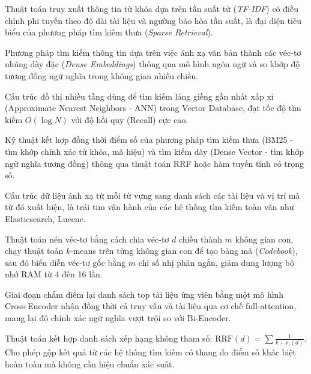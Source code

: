 \begin{description}[leftmargin=2.5cm, style=nextline]
  \item[\term{BM25 (Best Matching 25)}] Thuật toán truy xuất thông tin từ khóa dựa trên tần suất từ (\textit{TF-IDF}) có điều chỉnh phi tuyến theo độ dài tài liệu và ngưỡng bão hòa tần suất, là đại diện tiêu biểu của phương pháp tìm kiếm thưa (\textit{Sparse Retrieval}).

  \item[\term{Dense Retrieval}] Phương pháp tìm kiếm thông tin dựa trên việc ánh xạ văn bản thành các véc-tơ nhúng dày đặc (\textit{Dense Embeddings}) thông qua mô hình ngôn ngữ và so khớp độ tương đồng ngữ nghĩa trong không gian nhiều chiều.

  \item[\term{HNSW (Hierarchical Navigable Small World)}] Cấu trúc đồ thị nhiều tầng dùng để tìm kiếm láng giềng gần nhất xấp xỉ (Approximate Nearest Neighbors - ANN) trong Vector Database, đạt tốc độ tìm kiếm $O(\log N)$ với độ hồi quy (Recall) cực cao.

  \item[\term{Hybrid Search}] Kỹ thuật kết hợp đồng thời điểm số của phương pháp tìm kiếm thưa (BM25 - tìm khớp chính xác từ khóa, mã hiệu) và tìm kiếm dày (Dense Vector - tìm khớp ngữ nghĩa tương đồng) thông qua thuật toán RRF hoặc hàm tuyến tính có trọng số.

  \item[\term{Inverted Index (Chỉ Mục Đảo)}] Cấu trúc dữ liệu ánh xạ từ mỗi từ vựng sang danh sách các tài liệu và vị trí mà từ đó xuất hiện, là trái tim vận hành của các hệ thống tìm kiếm toàn văn như Elasticsearch, Lucene.

  \item[\term{Product Quantization (PQ)}] Thuật toán nén véc-tơ bằng cách chia véc-tơ $d$ chiều thành $m$ không gian con, chạy thuật toán $k$-means trên từng không gian con để tạo bảng mã (\textit{Codebook}), sau đó biểu diễn véc-tơ gốc bằng $m$ chỉ số nhị phân ngắn, giảm dung lượng bộ nhớ RAM từ 4 đến 16 lần.

  \item[\term{Reranking (Cross-Encoder)}] Giai đoạn chấm điểm lại danh sách top tài liệu ứng viên bằng một mô hình Cross-Encoder nhận đồng thời cả truy vấn và tài liệu qua cơ chế full-attention, mang lại độ chính xác ngữ nghĩa vượt trội so với Bi-Encoder.

  \item[\term{RRF (Reciprocal Rank Fusion)}] Thuật toán kết hợp danh sách xếp hạng không tham số: $\text{RRF}(d) = \sum \frac{1}{k + r_i(d)}$. Cho phép gộp kết quả từ các hệ thống tìm kiếm có thang đo điểm số khác biệt hoàn toàn mà không cần hiệu chuẩn xác suất.
\end{description}

